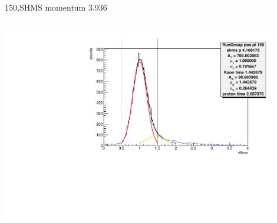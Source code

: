 \documentclass[aspectratio=169,xcolor=dvipsnames]{beamer}
\begin{document}
\begin{frame}{150,SHMS momentum 3.936}
\begin{columns}
\begin{column}[T]{0.3\textwidth}
\includegraphics[width = 0.9\textwidth]{results/pid/rftime/rftime_pos_150_5_pi.pdf}
\end{column}
\end{columns}
\end{frame}
\end{document}
